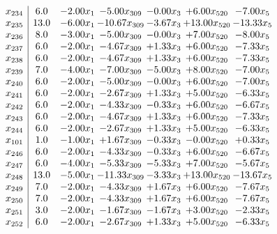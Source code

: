 \documentclass[8pt]{article}
\begin{document}
\[\begin{array}{c| c c@{\hskip 2pt} c@{\hskip 2pt} c@{\hskip 2pt} c@{\hskip 2pt} c@{\hskip 2pt} }
 x_{234}   &  6.0 & -2.00 x_{1} & -5.00 x_{309} & -0.00 x_{3} & +  6.00 x_{520} & -7.00 x_{5}\\
 x_{235}   &  13.0 & -6.00 x_{1} & -10.67 x_{309} & -3.67 x_{3} & + 13.00 x_{520} & -13.33 x_{5}\\
 x_{236}   &  8.0 & -3.00 x_{1} & -5.00 x_{309} & -0.00 x_{3} & +  7.00 x_{520} & -8.00 x_{5}\\
 x_{237}   &  6.0 & -2.00 x_{1} & -4.67 x_{309} & +  1.33 x_{3} & +  6.00 x_{520} & -7.33 x_{5}\\
 x_{238}   &  6.0 & -2.00 x_{1} & -4.67 x_{309} & +  1.33 x_{3} & +  6.00 x_{520} & -7.33 x_{5}\\
 x_{239}   &  7.0 & -4.00 x_{1} & -7.00 x_{309} & -5.00 x_{3} & +  8.00 x_{520} & -7.00 x_{5}\\
 x_{240}   &  6.0 & -2.00 x_{1} & -5.00 x_{309} & -0.00 x_{3} & +  6.00 x_{520} & -7.00 x_{5}\\
 x_{241}   &  6.0 & -2.00 x_{1} & -2.67 x_{309} & +  1.33 x_{3} & +  5.00 x_{520} & -6.33 x_{5}\\
 x_{242}   &  6.0 & -2.00 x_{1} & -4.33 x_{309} & -0.33 x_{3} & +  6.00 x_{520} & -6.67 x_{5}\\
 x_{243}   &  6.0 & -2.00 x_{1} & -4.67 x_{309} & +  1.33 x_{3} & +  6.00 x_{520} & -7.33 x_{5}\\
 x_{244}   &  6.0 & -2.00 x_{1} & -2.67 x_{309} & +  1.33 x_{3} & +  5.00 x_{520} & -6.33 x_{5}\\
 x_{101}   &  1.0 & -1.00 x_{1} & +  1.67 x_{309} & -0.33 x_{3} & -0.00 x_{520} & +  0.33 x_{5}\\
 x_{246}   &  6.0 & -2.00 x_{1} & -4.33 x_{309} & -0.33 x_{3} & +  6.00 x_{520} & -6.67 x_{5}\\
 x_{247}   &  6.0 & -4.00 x_{1} & -5.33 x_{309} & -5.33 x_{3} & +  7.00 x_{520} & -5.67 x_{5}\\
 x_{248}   &  13.0 & -5.00 x_{1} & -11.33 x_{309} & -3.33 x_{3} & + 13.00 x_{520} & -13.67 x_{5}\\
 x_{249}   &  7.0 & -2.00 x_{1} & -4.33 x_{309} & +  1.67 x_{3} & +  6.00 x_{520} & -7.67 x_{5}\\
 x_{250}   &  7.0 & -2.00 x_{1} & -4.33 x_{309} & +  1.67 x_{3} & +  6.00 x_{520} & -7.67 x_{5}\\
 x_{251}   &  3.0 & -2.00 x_{1} & -1.67 x_{309} & -1.67 x_{3} & +  3.00 x_{520} & -2.33 x_{5}\\
 x_{252}   &  6.0 & -2.00 x_{1} & -2.67 x_{309} & +  1.33 x_{3} & +  5.00 x_{520} & -6.33 x_{5}\\

\end{array}\]
\end{document}
